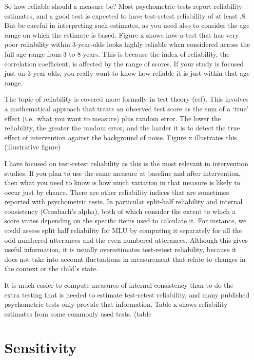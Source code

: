 \documentclass[]{book}
\begin{document}
So how reliable should a measure be? Most psychometric tests report reliability estimates, and a good test is expected to have test-retest reliability of at least .8. But be careful in interpreting such estimates, as you need also to consider the age range on which the estimate is based. Figure x shows how a test that has very poor reliability within 3-year-olds looks highly reliable when considered across the full age range from 3 to 8 years. This is because the index of reliability, the correlation coefficient, is affected by the range of scores. If your study is focused just on 3-year-olds, you really want to know how reliable it is just within that age range.

The topic of reliability is covered more formally in test theory (ref). This involves a mathematical approach that treats an observed test score as the sum of a `true' effect (i.e.~what you want to measure) plus random error. The lower the reliability, the greater the random error, and the harder it is to detect the true effect of intervention against the background of noise. Figure x illustrates this.
(illustrative figure)

I have focused on test-retest reliability as this is the most relevant in intervention studies. If you plan to use the same measure at baseline and after intervention, then what you need to know is how much variation in that measure is likely to occur just by chance. There are other reliability indices that are sometimes reported with psychometric tests. In particular split-half reliability and internal consistency (Cronbach's alpha), both of which consider the extent to which a score varies depending on the specific items used to calculate it. For instance, we could assess split half reliability for MLU by computing it separately for all the odd-numbered utterances and the even-numbered utterances. Although this gives useful information, it is usually overestimates test-retest reliability, because it does not take into account fluctuations in measurement that relate to changes in the context or the child's state.

It is much easier to compute measures of internal consistency than to do the extra testing that is needed to estimate test-retest reliability, and many published psychometric tests only provide that information. Table x shows reliability estimates from some commonly used tests.
(table

\hypertarget{sensitivity}{%
\section{Sensitivity}\label{sensitivity}}
\end{document}
